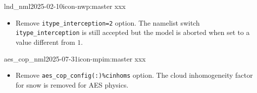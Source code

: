 \begin{changeitem}{lnd\_nml}{2025-02-10}{icon-nwp:master xxx}
  \begin{itemize}
    \item Remove \texttt{itype\_interception=2} option. The namelist switch \texttt{itype\_interception} is still accepted but the model is aborted when set to a value different from $1$.
  \end{itemize}
\end{changeitem}

\begin{changeitem}{aes\_cop\_nml}{2025-07-31}{icon-mpim:master xxx}
  \begin{itemize}
    \item Remove \texttt{aes\_cop\_config(:)\%cinhoms} option. The cloud inhomogeneity factor for snow is removed for AES physics.
  \end{itemize}
\end{changeitem}

